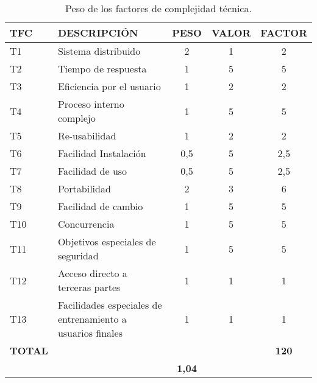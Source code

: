 \begin{table}[H]
\begin{center}
\begin{tabular}{l l c c c}
\textbf{TFC} & \textbf{DESCRIPCIÓN} & \textbf{PESO} & \textbf{VALOR} & \textbf{FACTOR}\\ \hline \hline
T1	&	Sistema distribuido	&	2	&	1	&	2	\\
T2	&	Tiempo de respuesta	&	1	&	5	&	5	\\
T3	&	Eficiencia por el usuario	&	1	&	2	&	2	\\
T4	&	Proceso interno complejo	&	1	&	5	&	5	\\
T5	&	Re-usabilidad	&	1	&	2	&	2	\\
T6	&	Facilidad Instalación	&	0,5	&	5	&	2,5	\\
T7	&	Facilidad de uso	&	0,5	&	5	&	2,5	\\
T8	&	Portabilidad	&	2	&	3	&	6	\\
T9	&	Facilidad de cambio	&	1	&	5	&	5	\\
T10	&	Concurrencia	&	1	&	5	&	5	\\
T11	&	Objetivos especiales de seguridad	&	1	&	5	&	5	\\
T12	&	Acceso directo a terceras partes	&	1	&	1	&	1	\\
T13	&	Facilidades especiales de entrenamiento a usuarios finales	&	1	&	1	&	1	\\ \hline
\textbf{TOTAL} & & & & \textbf{120}\\ \hline \hline
\multicolumn{2}{l}{}\textbf{Factores técnicos} & \textbf{1,04} & & \\ \hline \hline
\end{tabular}
\caption{Peso de los factores de complejidad técnica.}
\label{tab:tcf}
\end{center}
\end{table}


